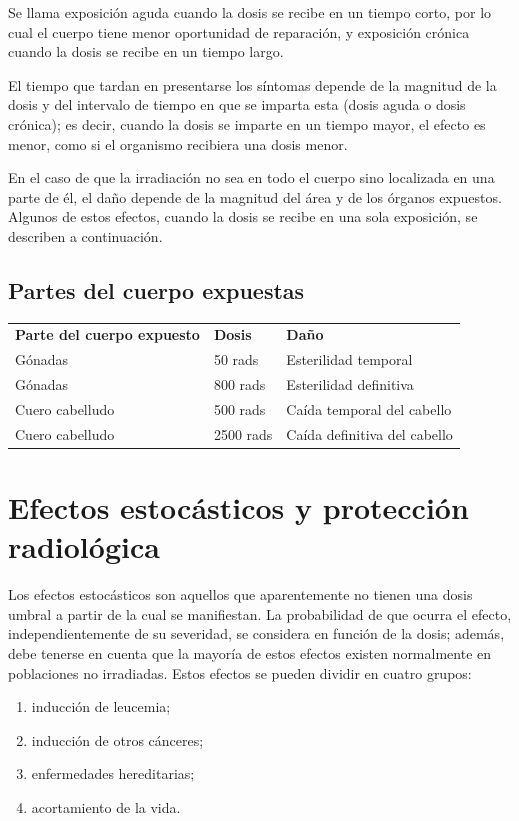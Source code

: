 Se llama exposición aguda cuando la dosis se recibe en un tiempo corto, por lo cual el cuerpo tiene menor oportunidad de reparación, y exposición crónica cuando la dosis se recibe en un tiempo largo.

El tiempo que tardan en presentarse los síntomas depende de la magnitud de la dosis y del intervalo de tiempo en que se imparta esta (dosis aguda o dosis crónica); es decir, cuando la dosis se imparte en un tiempo mayor, el efecto es menor, como si el organismo recibiera una dosis menor.

En el caso de que la irradiación no sea en todo el cuerpo sino localizada en una parte de él, el daño depende de la magnitud del área y de los órganos expuestos. Algunos de estos efectos, cuando la dosis se recibe en una sola exposición, se describen a continuación.

\subsection{Partes del cuerpo expuestas}

\begin{center}
\begin{tabular}{lll}
\textbf{Parte del cuerpo expuesto} & \textbf{Dosis} & \textbf{Daño} \\
Gónadas       & 50 rads   & Esterilidad temporal \\
Gónadas       & 800 rads  & Esterilidad definitiva \\
Cuero cabelludo & 500 rads  & Caída temporal del cabello \\
Cuero cabelludo & 2500 rads & Caída definitiva del cabello \\
\end{tabular}
\end{center}

\section{Efectos estocásticos y protección radiológica}

Los efectos estocásticos son aquellos que aparentemente no tienen una dosis umbral a partir de la cual se manifiestan. La probabilidad de que ocurra el efecto, independientemente de su severidad, se considera en función de la dosis; además, debe tenerse en cuenta que la mayoría de estos efectos existen normalmente en poblaciones no irradiadas. Estos efectos se pueden dividir en cuatro grupos:
\begin{enumerate}
  \item inducción de leucemia;
  \item inducción de otros cánceres;
  \item enfermedades hereditarias;
  \item acortamiento de la vida.
\end{enumerate}

